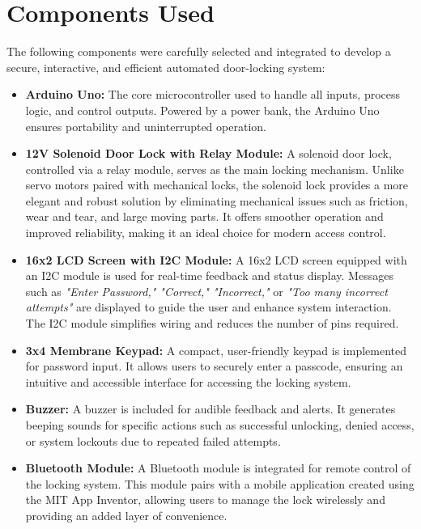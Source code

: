 \documentclass[a4paper, 12pt]{article}
\begin{document}
\section*{Components Used}
The following components were carefully selected and integrated to develop a secure, interactive, and efficient automated door-locking system:

\begin{itemize}
    \item \textbf{Arduino Uno:} 
    The core microcontroller used to handle all inputs, process logic, and control outputs. Powered by a power bank, the Arduino Uno ensures portability and uninterrupted operation.

    \item \textbf{12V Solenoid Door Lock with Relay Module:} 
    A solenoid door lock, controlled via a relay module, serves as the main locking mechanism. Unlike servo motors paired with mechanical locks, the solenoid lock provides a more elegant and robust solution by eliminating mechanical issues such as friction, wear and tear, and large moving parts. It offers smoother operation and improved reliability, making it an ideal choice for modern access control.

    \item \textbf{16x2 LCD Screen with I2C Module:} 
    A 16x2 LCD screen equipped with an I2C module is used for real-time feedback and status display. Messages such as \textit{"Enter Password," "Correct," "Incorrect,"} or \textit{"Too many incorrect attempts"} are displayed to guide the user and enhance system interaction. The I2C module simplifies wiring and reduces the number of pins required.

    \item \textbf{3x4 Membrane Keypad:} 
    A compact, user-friendly keypad is implemented for password input. It allows users to securely enter a passcode, ensuring an intuitive and accessible interface for accessing the locking system.

    \item \textbf{Buzzer:} 
    A buzzer is included for audible feedback and alerts. It generates beeping sounds for specific actions such as successful unlocking, denied access, or system lockouts due to repeated failed attempts.

    \item \textbf{Bluetooth Module:} 
    A Bluetooth module is integrated for remote control of the locking system. This module pairs with a mobile application created using the MIT App Inventor, allowing users to manage the lock wirelessly and providing an added layer of convenience.


\end{itemize}
\end{document}
